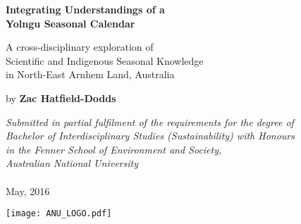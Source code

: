 \renewcommand*{\maketitle}{%
\begin{titlepage}
    \begin{center}
        \vspace*{1cm}

        \Huge
        \textbf{Integrating Understandings of a\\
        Yolngu Seasonal Calendar}

        \vspace{1cm}
        \Large
        A cross-disciplinary exploration of\\
        Scientific and Indigenous Seasonal Knowledge\\
        in North-East Arnhem Land, Australia

        \vspace{1.5cm}

        by \textbf{Zac Hatfield-Dodds}

        \vfill

        \large \textit{
        Submitted in partial fulfilment of the requirements for the degree of\\
        Bachelor of Interdisciplinary Studies (Sustainability) with Honours\\
        in the Fenner School of Environment and Society,\\
        Australian National University\\
        }~\\
        May, 2016

        \vspace{1.5cm}

        \texttt{[image: ANU\_LOGO.pdf]}

    \end{center}
\end{titlepage}
}

\clearpage\maketitle
\thispagestyle{empty}
